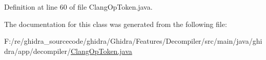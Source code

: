 Definition at line 60 of file Clang\+Op\+Token.\+java.



The documentation for this class was generated from the following file\+:\begin{DoxyCompactItemize}
\item 
F\+:/re/ghidra\+\_\+sourcecode/ghidra/\+Ghidra/\+Features/\+Decompiler/src/main/java/ghidra/app/decompiler/\mbox{\hyperlink{_clang_op_token_8java}{Clang\+Op\+Token.\+java}}\end{DoxyCompactItemize}
